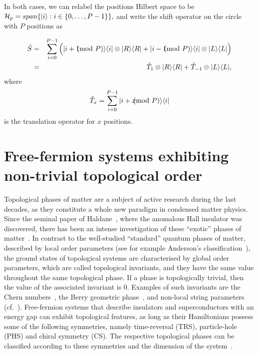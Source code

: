 In both cases, we can relabel the positions Hilbert space to be $\mathcal{H}_p =span\{| i \rangle:i\in\{0,\dots,P-1\}\},$
and  write  the shift operator on the circle with $P$ positions as

\begin{eqnarray}
\label{shift}
\hat{S}& = &\sum_{i= 0}^{P-1} \Big(\ket{i+1 \ppmod {P}}\bra{i}  \otimes \ket{R} \bra{R} + \ket{i-1 \ppmod P}\bra{i}  \otimes \ket{L} \bra{L} \Big)\nonumber\\
		&=& \hat{T}_1 \otimes \ket{R} \bra{R} + \hat{T}_{-1} \otimes \ket{L} \bra{L},
\end{eqnarray}
where 
\begin{equation}
\hat{T}_x = \sum_{i=0}^{P-1}|  i+x \!\!\!\!\!\pmod P \rangle\langle i |
\end{equation}
is the translation operator for $x$ positions.



\section{Free-fermion systems exhibiting non-trivial topological order}
Topological phases of matter are a subject of active research during the last decades, as they constitute a whole new paradigm in condensed matter physics. Since the seminal paper of Haldane~\cite{hal:88}, where the anomalous Hall insulator was discovered, there has been an intense investigation of these ``exotic'' phases of matter~\cite{wen:90, kos:tho:72, kos:tho:73, hal:83}. In contrast to the well-studied ``standard'' quantum phases of matter, described by local order parameters (see for example Anderson's classification~\cite{and:07}), the ground states of topological systems are  characterised by global order parameters, which are called topological invariants, and they have the same value throughout the same topological phase. If a phase is topologically trivial, then the value of the associated invariant is 0. Examples of such invariants are the Chern numbers~\cite{tknn:82}, the Berry geometric phase~\cite{ber:84}, and non-local string parameters~\cite{zen:che:zho:wen:15} (cf.~\cite{ando:13}).  
 Free-fermion systems that describe insulators and superconductors with an energy gap can exhibit topological features, as long as their Hamiltonians possess some of the following symmetries, namely time-reversal (TRS), particle-hole (PHS) and chiral symmetry (CS). The respective topological phases can be classified according to these symmetries and the dimension of the system~\cite{kit:09, sch:ryu:fur:lud:08}. 
 
